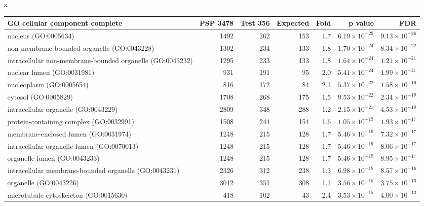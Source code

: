 x
\begin{table}[ht]
\centering
\begin{adjustbox}{width=\textwidth}
\begin{tabular}{lrrrrrr}
  \hline
GO cellular component complete & PSP 3478 & Test 356 & Expected & Fold & p value & FDR \\ 
  \hline
nucleus (GO:0005634) & 1492 & 262 & 153 & 1.7 & $6.19 \times 10^{-29}$ & $9.13 \times 10^{-26}$ \\ 
  non-membrane-bounded organelle (GO:0043228) & 1302 & 234 & 133 & 1.8 & $1.70 \times 10^{-24}$ & $8.34 \times 10^{-22}$ \\ 
  intracellular non-membrane-bounded organelle (GO:0043232) & 1295 & 233 & 133 & 1.8 & $1.64 \times 10^{-24}$ & $1.21 \times 10^{-21}$ \\ 
  nuclear lumen (GO:0031981) & 931 & 191 & 95 & 2.0 & $5.41 \times 10^{-24}$ & $1.99 \times 10^{-21}$ \\ 
  nucleoplasm (GO:0005654) & 816 & 172 & 84 & 2.1 & $5.37 \times 10^{-22}$ & $1.58 \times 10^{-19}$ \\ 
  cytosol (GO:0005829) & 1708 & 268 & 175 & 1.5 & $9.53 \times 10^{-22}$ & $2.34 \times 10^{-19}$ \\ 
  intracellular organelle (GO:0043229) & 2809 & 348 & 288 & 1.2 & $2.15 \times 10^{-21}$ & $4.53 \times 10^{-19}$ \\ 
  protein-containing complex (GO:0032991) & 1508 & 244 & 154 & 1.6 & $1.05 \times 10^{-19}$ & $1.93 \times 10^{-17}$ \\ 
  membrane-enclosed lumen (GO:0031974) & 1248 & 215 & 128 & 1.7 & $5.46 \times 10^{-19}$ & $7.32 \times 10^{-17}$ \\ 
  intracellular organelle lumen (GO:0070013) & 1248 & 215 & 128 & 1.7 & $5.46 \times 10^{-19}$ & $8.06 \times 10^{-17}$ \\ 
  organelle lumen (GO:0043233) & 1248 & 215 & 128 & 1.7 & $5.46 \times 10^{-19}$ & $8.95 \times 10^{-17}$ \\ 
  intracellular membrane-bounded organelle (GO:0043231) & 2326 & 312 & 238 & 1.3 & $6.98 \times 10^{-18}$ & $8.57 \times 10^{-16}$ \\ 
  organelle (GO:0043226) & 3012 & 351 & 308 & 1.1 & $3.56 \times 10^{-15}$ & $3.75 \times 10^{-13}$ \\ 
  microtubule cytoskeleton (GO:0015630) & 418 & 102 & 43 & 2.4 & $3.53 \times 10^{-15}$ & $4.00 \times 10^{-13}$ \\ 

\end{tabular}
\end{adjustbox}
\end{table}
